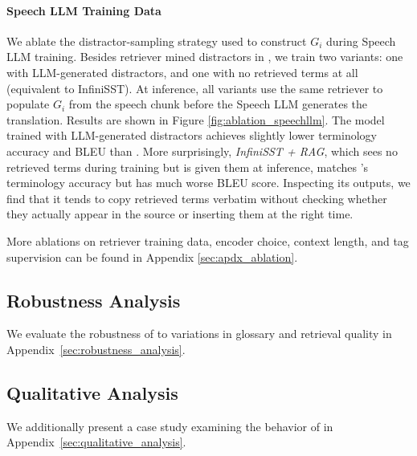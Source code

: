 \paragraph{Speech LLM Training Data}
We ablate the distractor-sampling strategy used to construct $G_i$ during Speech LLM training. Besides retriever mined distractors in \method, we train two variants: one with LLM-generated distractors, and one with no retrieved terms at all (equivalent to InfiniSST). At inference, all variants use the same retriever to populate $G_i$ from the speech chunk before the Speech LLM generates the translation. Results are shown in Figure \ref{fig:ablation_speechllm}. The model trained with LLM-generated distractors achieves slightly lower terminology accuracy and BLEU than \method. More surprisingly, \textit{InfiniSST + RAG}, which sees no retrieved terms during training but is given them at inference, matches \method's terminology accuracy but has much worse BLEU score. Inspecting its outputs, we find that it tends to copy retrieved terms verbatim without checking whether they actually appear in the source or inserting them at the right time.

More ablations on retriever training data, encoder choice, context length, and tag supervision can be found in Appendix \ref{sec:apdx_ablation}.

\subsection{Robustness Analysis}

We evaluate the robustness of \method to variations in glossary and retrieval quality in Appendix~\ref{sec:robustness_analysis}.

\subsection{Qualitative Analysis}

We additionally present a case study examining the behavior of \method in Appendix~\ref{sec:qualitative_analysis}.
